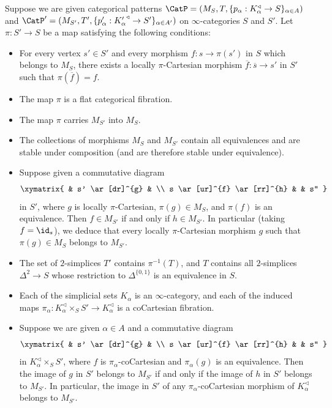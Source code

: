 \begin{proposition}\label{candied}
Suppose we are given categorical patterns
$\CatP = (M_S, T, \{ p_{\alpha}: K_{\alpha}^{\triangleleft} \rightarrow S\}_{\alpha \in A})$ and
$\CatP' = (M_{S'}, T', \{ p'_{\alpha}: {K'_{\alpha}}^{\triangleleft} \rightarrow S'\}_{\alpha \in A'})$ on $\infty$-categories $S$ and $S'$. Let $\pi: S' \rightarrow S$ be a map satisfying the following conditions:
\begin{itemize}
\item[$(i)$]  For every vertex $s' \in S'$ and every morphism $f: s \rightarrow \pi(s')$ in
$S$ which belongs to $M_{S}$, there exists a locally $\pi$-Cartesian morphism
$\overline{f}: \overline{s} \rightarrow s'$ in $S'$ such that $\pi( \overline{f} ) = f$.
\item[$(ii)$] The map $\pi$ is a flat categorical fibration.
\item[$(iii)$] The map $\pi$ carries $M_{S'}$ into $M_{S}$.
\item[$(iv)$] The collections of morphisms $M_{S}$ and $M_{S'}$ contain all equivalences
and are stable under composition (and are therefore stable under equivalence).
\item[$(v)$] Suppose given a commutative diagram
$$\xymatrix{ & s' \ar[dr]^{g} & \\
s \ar[ur]^{f} \ar[rr]^{h} & & s'' }$$
in $S'$, where $g$ is locally $\pi$-Cartesian, $\pi(g) \in M_{S}$, and $\pi(f)$ is an equivalence. Then
$f \in M_{S'}$ if and only if $h \in M_{S'}$. In particular (taking $f = \id_{s}$), we deduce that
every locally $\pi$-Cartesian morphism $g$ such that $\pi(g) \in M_{S}$ belongs to $M_{S'}$.

\item[$(vi)$] The set of $2$-simplices $T'$ contains $\pi^{-1}(T)$, and $T$ contains
all $2$-simplices $\Delta^2 \rightarrow S$ whose restriction to $\Delta^{ \{0,1\} }$ is an equivalence in $S$.

\item[$(vii)$] Each of the simplicial sets $K_{\alpha}$ is an $\infty$-category, and each of the induced maps $\pi_{\alpha}: K_{\alpha}^{\triangleleft} \times_{S} S' \rightarrow K_{\alpha}^{\triangleleft}$ is a coCartesian fibration.

\item[$(viii)$] Suppose we are given $\alpha \in A$ and a commutative diagram
$$ \xymatrix{ & s' \ar[dr]^{g} & \\
s \ar[ur]^{f} \ar[rr]^{h} & & s'' }$$
in $K_{\alpha}^{\triangleleft} \times_{S} S'$, where
$f$ is $\pi_{\alpha}$-coCartesian and $\pi_{\alpha}(g)$ is an equivalence. Then the image of $g$ in $S'$ belongs to $M_{S'}$
if and only if the image of $h$ in $S'$ belongs to $M_{S'}$. In particular, the image in $S'$ of
any $\pi_{\alpha}$-coCartesian morphism of $K_{\alpha}^{\triangleleft}$ belongs to $M_{S'}$.


\end{itemize}
\end{proposition}
